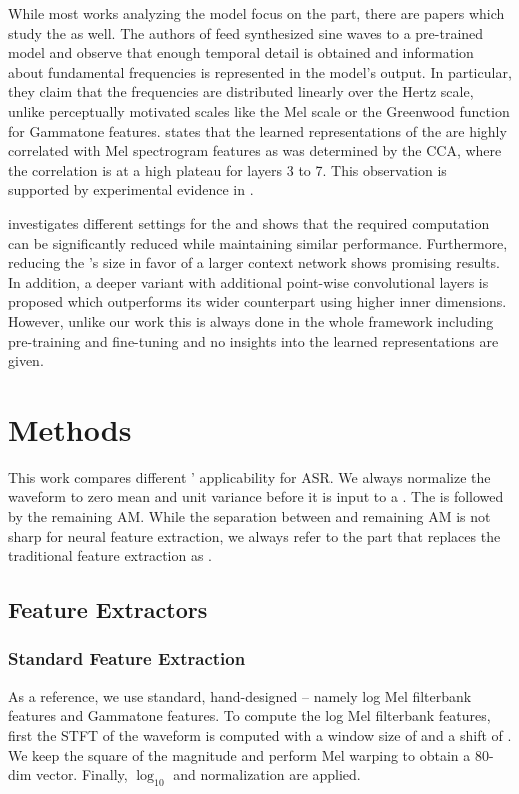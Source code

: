 \documentclass{INTERSPEECH2023}
\begin{document}
While most works analyzing the \wvtwo model focus on the \transformer part, there are papers which study the \fe as well.
The authors of \cite{choi2022w2v2fe} feed synthesized sine waves to a pre-trained model and observe that enough temporal detail is obtained and information about fundamental frequencies is represented in the model's output.
In particular, they claim that the frequencies are distributed linearly over the Hertz scale, unlike perceptually motivated scales like the Mel scale or the Greenwood function for Gammatone features.
\cite{livescu2021wav2vec_analysis} states that the learned representations of the \fe are highly correlated with Mel spectrogram features as was determined by the \gls{CCA}, where the correlation is at a high plateau for \fe layers 3 to 7.
This observation is supported by experimental evidence in \cite{dieck2022wav2vec}.

\cite{asapp2022performance} investigates different settings for the \wvtwo \fe and shows that the required computation can be significantly reduced while maintaining similar performance.
Furthermore, reducing the \fe's size in favor of a larger context network shows promising results.
In addition, a deeper variant with additional point-wise convolutional layers is proposed which outperforms its wider counterpart using higher inner dimensions.
However, unlike our work this is always done in the whole \wvtwo framework including pre-training and fine-tuning and no insights into the learned representations are given.

\section{Methods}
This work compares different \fes' applicability for \gls{ASR}.
We always normalize the waveform to zero mean and unit variance before it is input to a \fe.
The \fe is followed by the remaining \gls{AM}.
While the separation between \fe and remaining \gls{AM} is not sharp for neural feature extraction, we always refer to the part that replaces the traditional feature extraction as \fe.

\subsection{Feature Extractors}
\subsubsection{Standard Feature Extraction}
As a reference, we use standard, hand-designed \fes -- namely log Mel filterbank features and Gammatone features.
To compute the log Mel filterbank features, first the \gls{STFT} of the waveform is computed with a window size of  and a shift of .
We keep the square of the magnitude and perform Mel warping to obtain a 80-dim vector.
Finally, $\log_{10}$ and normalization are applied.
\end{document}
